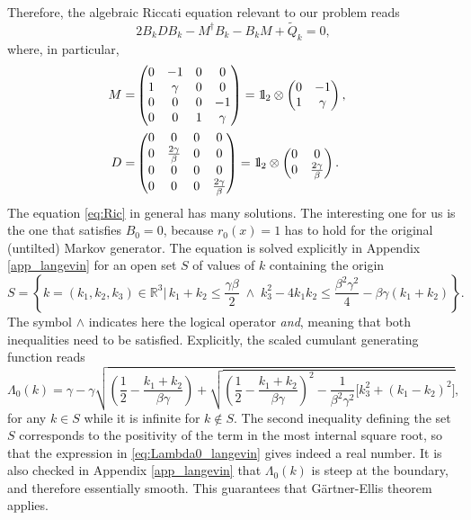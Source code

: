 \documentclass[a4paper,11pt]{article}
\numberwithin{equation}{section}
\newcommand{\bbbone}{\mathchoice {\rm 1\mskip-4mu l} {\rm 1\mskip-4mu l}
{\rm 1\mskip-4.5mu l} {\rm 1\mskip-5mu l}}
\begin{document}
Therefore, the algebraic Riccati equation relevant to our problem reads
\begin{equation}\label{eq:Ric}
    2 B_k D B_k - M^\dag B_k - B_k M + \widetilde{Q}_k =0,
\end{equation}
where, in particular,
\begin{align}
    M = &
    \begin{pmatrix}
       0 & -1 & 0 & 0 \\
       1 & \gamma &0 &0 \\
       0 &0 & 0 & -1 \\
       0 &0 & 1 & \gamma
    \end{pmatrix} = \bbbone_2 \otimes 
    \begin{pmatrix}
       0 & -1 \\
       1 & \gamma 
    \end{pmatrix} , \quad 
    \\
    \label{eq:D}
    D = &
    \begin{pmatrix}
       0 & 0 & 0 & 0 \\
       0 & \frac{2\gamma}{\beta} &0 &0 \\
       0 &0 & 0 & 0 \\
       0 &0 & 0 & \frac{2\gamma}{\beta} 
    \end{pmatrix} = \bbbone_2 \otimes 
    \begin{pmatrix}
       0 & 0 \\
       0 & \frac{2\gamma}{\beta} 
    \end{pmatrix} . 
\end{align}
The equation \eqref{eq:Ric} in general has many solutions. The interesting one for us is the one that satisfies $B_0=0$, because $r_0(x) = 1$ has to hold for the original (untilted) Markov generator. 
The equation is solved explicitly in Appendix \ref{app_langevin} for an open set $S$ of values of $k$ containing the origin
\begin{equation}
    S= \left\{ k=(k_1,k_2,k_3) \in \mathbb{R}^3 \Big| \, k_1+k_2 \leq \frac{\gamma \beta}{2} \; \wedge \; k_3^2 - 4k_1 k_2 \leq \frac{\beta^2\gamma^2}{4} - \beta\gamma (k_1 + k_2)\right\}.
\end{equation}
The symbol $\wedge$ indicates here the logical operator \emph{and}, meaning that both inequalities need to be satisfied.
Explicitly, the scaled cumulant generating function reads
\begin{equation}\label{eq:Lambda0_langevin}
    \Lambda_0(k) =  \gamma - \gamma\sqrt{  \left( \frac{1}{2} - \frac{k_1 +k_2}{\beta\gamma}   \right) + \sqrt{\left( \frac{1}{2} - \frac{k_1 +k_2}{\beta\gamma}   \right)^2 - \frac{1}{\beta^2\gamma^2}\Big[ k_3^2 + (k_1 -k_2)^2 \Big]}},
\end{equation}
for any $k \in S$ while it is infinite for $k \notin S$. The second inequality defining the set $S$ corresponds to the positivity of the term in the most internal square root, so that the expression in \eqref{eq:Lambda0_langevin} gives indeed a real number. It is also checked in Appendix \ref{app_langevin} that $\Lambda_0(k)$ is steep at the boundary, and therefore essentially smooth. This guarantees that G\"artner-Ellis theorem applies.
\end{document}
